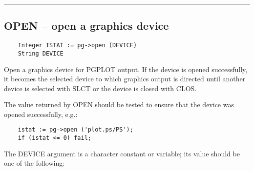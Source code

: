 \hrule

\subsection*{OPEN -- open a graphics device }

\begin{verbatim}
    Integer ISTAT := pg->open (DEVICE)
    String DEVICE
\end{verbatim}

Open a graphics device for PGPLOT output.  If the device is opened
successfully, it becomes the selected device to which graphics output
is directed until another device is selected with SLCT or the device
is closed with CLOS.

The value returned by OPEN should be tested to ensure that the device
was opened successfully, e.g.:

\begin{verbatim}
    istat := pg->open ('plot.ps/PS');
    if (istat <= 0) fail;
\end{verbatim}

The DEVICE argument is a character constant or variable; its value
should be one of the following:

